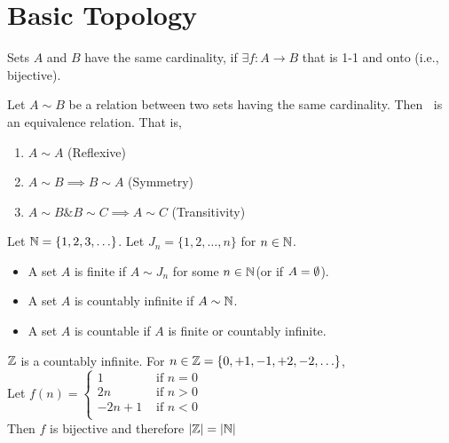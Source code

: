 \chapter{Basic Topology}

\begin{definition}
	Sets $A$ and $B$ have the same cardinality, if $\exists f: A \to B$ that is 1-1 and onto (i.e., bijective).
\end{definition}

\begin{thm}
	Let $A\sim B$ be a relation between two sets having the same cardinality. Then $~$ is an equivalence relation. That is,
	\begin{enumerate}
		\item $A\sim A$ (Reflexive)
		\item $A\sim B \implies B\sim A$ (Symmetry)
		\item $A\sim B \& B\sim C\implies A \sim C$ (Transitivity)
	\end{enumerate}
\end{thm}
\begin{definition}
	Let $\mathbb{N} =\{1,2,3,\ldots\}$. Let $J_{n}=\{1,2,\ldots,n\}$ for $n \in \mathbb{N} $.
	\begin{itemize}
		\item A set $A$ is finite if $A\sim J_{n}$ for some $n \in \mathbb{N} $(or if $A=\emptyset $).
		\item A set $A$ is countably infinite if $A\sim \mathbb{N} $.
		\item A set $A$ is countable if $A$ is finite or countably infinite.
	\end{itemize}
\end{definition}
\begin{example}
	$\mathbb{Z} $ is a countably infinite.
	For $n \in \mathbb{Z}=\{0,+1,-1,+2,-2,\ldots\}$, \\
	Let $f(n)=\begin{cases}
			1      & \text{ if $n=0$} \\
			2n     & \text{ if $n>0$} \\
			-2n +1 & \text{ if $n<0$} \\
		\end{cases}$\\
	Then $f$ is bijective and therefore $|\mathbb{Z}|=|\mathbb{N}|$
\end{example}

